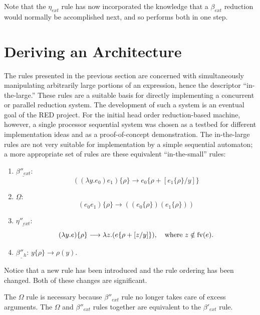 Note that the \(\eta_{ext}\) rule has now incorporated the knowledge that a
\(\beta_{ext}\) reduction would normally be accomplished next, and so performs
both in one step.

\section{Deriving an Architecture}

The rules presented in the previous section are concerned with simultaneously
manipulating arbitrarily large portions of an expression, hence the descriptor
``in-the-large.'' These rules are a suitable basis for directly implementing a
concurrent or parallel reduction system. The development of such a system is an
eventual goal of the RED project. For the initial head order reduction-based
machine, however, a single processor sequential system was chosen as a testbed
for different implementation ideas and as a proof-of-concept demonstration. The
in-the-large rules are not very suitable for implementation by a simple
sequential automaton; a more appropriate set of rules are these equivalent
``in-the-small'' rules:

\begin{enumerate}
\item \(\underline{\beta''_{ext}}\):
\[
((\lambda y.e_0)e_1)\{\rho\}\longrightarrow e_0\{\rho+[e_1\{\rho\}/y]\}
\]
\item \(\underline{\Omega}\):
\[
(e_0e_1)\{\rho\}\longrightarrow ((e_0\{\rho\})(e_1\{\rho\}))
\]
\item \(\underline{\eta''_{ext}}\):
\[
(\lambda y.e)\{\rho\}\longrightarrow \lambda z.(e\{\rho+[z/y]\}),
\quad \text{where } z\notin \operatorname{fv}(e).
\]
\item \(\underline{\beta''_h}\): \(y\{\rho\}\longrightarrow \rho(y)\).
\end{enumerate}

Notice that a new rule has been introduced and the rule ordering has been
changed. Both of these changes are significant.

The \(\Omega\) rule is necessary because \(\beta''_{ext}\) rule no longer takes
care of excess arguments. The \(\Omega\) and \(\beta''_{ext}\) rules together
are equivalent to the \(\beta'_{ext}\) rule.

